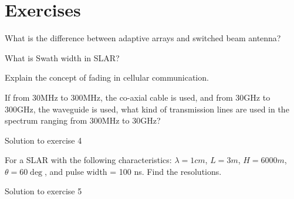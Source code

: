 \newpage
\section*{Exercises}
\begin{ExerciseList}
\Exercise[label={ex11}]
What is the difference between adaptive arrays and switched beam antenna?

\Exercise[label={ex12}]
What is Swath width in SLAR?

\Exercise[label={ex13}]
Explain the concept of fading in cellular communication.

\Exercise[label={ex14}]
If from 30MHz to 300MHz, the co-axial cable is used, and from 30GHz to 300GHz, the waveguide is used, what kind of transmission lines are used in the spectrum ranging from 300MHz to 30GHz?

\Answer[ref={ex14}]
Solution to exercise 4

\Exercise[label={ex15}]
For a SLAR with the following characteristics: $\lambda = 1cm$, $L = 3m$, $H = 6000m$,
$\theta = 60\deg$, and pulse width = 100 ns. 
Find the resolutions.

\Answer[ref={ex15}]
Solution to exercise 5
\end{ExerciseList}

